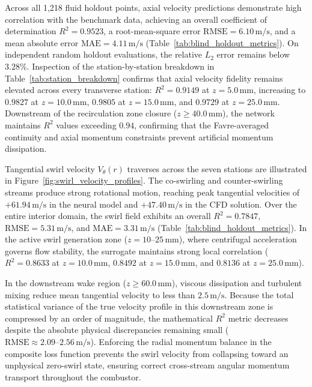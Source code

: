 \documentclass[reprint,aps,prfluids,superscriptaddress,twocolumn,floatfix]{revtex4-2}
\begin{document}
Across all 1,218 fluid holdout points, axial velocity predictions demonstrate high correlation with the benchmark data, achieving an overall coefficient of determination $R^2 = 0.9523$, a root-mean-square error $\text{RMSE} = 6.10\,\text{m/s}$, and a mean absolute error $\text{MAE} = 4.11\,\text{m/s}$ (Table~\ref{tab:blind_holdout_metrics}). On independent random holdout evaluations, the relative $L_2$ error remains below $3.28\%$. Inspection of the station-by-station breakdown in Table~\ref{tab:station_breakdown} confirms that axial velocity fidelity remains elevated across every transverse station: $R^2 = 0.9149$ at $z = 5.0\,\text{mm}$, increasing to $0.9827$ at $z = 10.0\,\text{mm}$, $0.9805$ at $z = 15.0\,\text{mm}$, and $0.9729$ at $z = 25.0\,\text{mm}$. Downstream of the recirculation zone closure ($z \ge 40.0\,\text{mm}$), the network maintains $R^2$ values exceeding $0.94$, confirming that the Favre-averaged continuity and axial momentum constraints prevent artificial momentum dissipation.

Tangential swirl velocity $V_\theta(r)$ traverses across the seven stations are illustrated in Figure~\ref{fig:swirl_velocity_profiles}. The co-swirling and counter-swirling streams produce strong rotational motion, reaching peak tangential velocities of $+61.94\,\text{m/s}$ in the neural model and $+47.40\,\text{m/s}$ in the CFD solution. Over the entire interior domain, the swirl field exhibits an overall $R^2 = 0.7847$, $\text{RMSE} = 5.31\,\text{m/s}$, and $\text{MAE} = 3.31\,\text{m/s}$ (Table~\ref{tab:blind_holdout_metrics}). In the active swirl generation zone ($z = 10\text{--}25\,\text{mm}$), where centrifugal acceleration governs flow stability, the surrogate maintains strong local correlation ($R^2 = 0.8633$ at $z = 10.0\,\text{mm}$, $0.8492$ at $z = 15.0\,\text{mm}$, and $0.8136$ at $z = 25.0\,\text{mm}$). 

In the downstream wake region ($z \ge 60.0\,\text{mm}$), viscous dissipation and turbulent mixing reduce mean tangential velocity to less than $2.5\,\text{m/s}$. Because the total statistical variance of the true velocity profile in this downstream zone is compressed by an order of magnitude, the mathematical $R^2$ metric decreases despite the absolute physical discrepancies remaining small ($\text{RMSE} \approx 2.09\text{--}2.56\,\text{m/s}$). Enforcing the radial momentum balance in the composite loss function prevents the swirl velocity from collapsing toward an unphysical zero-swirl state, ensuring correct cross-stream angular momentum transport throughout the combustor.
\end{document}
